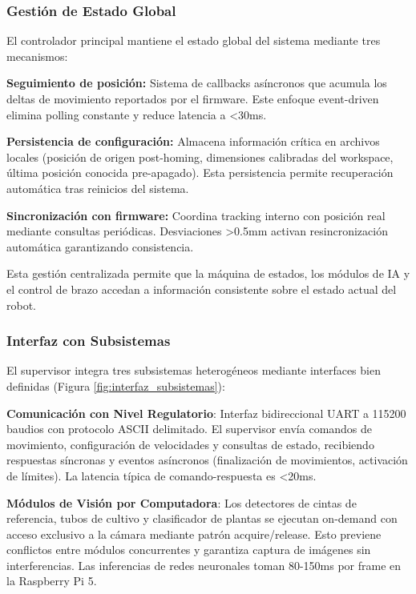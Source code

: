 \subsubsection{Gestión de Estado Global}

El controlador principal mantiene el estado global del sistema mediante tres mecanismos:

\textbf{Seguimiento de posición:} Sistema de callbacks asíncronos que acumula los deltas de movimiento reportados por el firmware. Este enfoque event-driven elimina polling constante y reduce latencia a <30ms.

\textbf{Persistencia de configuración:} Almacena información crítica en archivos locales (posición de origen post-homing, dimensiones calibradas del workspace, última posición conocida pre-apagado). Esta persistencia permite recuperación automática tras reinicios del sistema.

\textbf{Sincronización con firmware:} Coordina tracking interno con posición real mediante consultas periódicas. Desviaciones >0.5mm activan resincronización automática garantizando consistencia.

Esta gestión centralizada permite que la máquina de estados, los módulos de IA y el control de brazo accedan a información consistente sobre el estado actual del robot.

\subsubsection{Interfaz con Subsistemas}

El supervisor integra tres subsistemas heterogéneos mediante interfaces bien definidas (Figura \ref{fig:interfaz_subsistemas}):

\textbf{Comunicación con Nivel Regulatorio}: Interfaz bidireccional UART a 115200 baudios con protocolo ASCII delimitado. El supervisor envía comandos de movimiento, configuración de velocidades y consultas de estado, recibiendo respuestas síncronas y eventos asíncronos (finalización de movimientos, activación de límites). La latencia típica de comando-respuesta es <20ms.

\textbf{Módulos de Visión por Computadora}: Los detectores de cintas de referencia, tubos de cultivo y clasificador de plantas se ejecutan on-demand con acceso exclusivo a la cámara mediante patrón acquire/release. Esto previene conflictos entre módulos concurrentes y garantiza captura de imágenes sin interferencias. Las inferencias de redes neuronales toman 80-150ms por frame en la Raspberry Pi 5.

